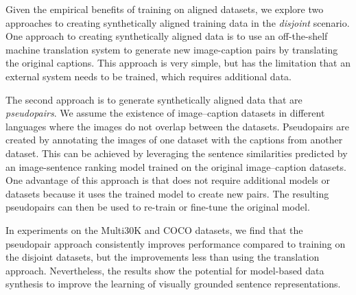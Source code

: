  
 Given the empirical benefits of training on aligned datasets, 
 we explore two approaches to creating synthetically 
 aligned training data in the \emph{disjoint} scenario. 
 One approach to creating synthetically aligned data is to use an
 off-the-shelf machine translation system to generate 
 new image-caption pairs by translating the original
 captions.
 This approach is very simple, but has the limitation 
 that an external system needs to be trained, which requires additional data. 
 
 The second approach is to generate synthetically aligned data that are \emph{pseudopairs}. We assume the existence of image--caption datasets in different languages where the images do not overlap between the datasets. Pseudopairs are created by annotating the images of one dataset with the captions from another dataset. This can be achieved by leveraging the sentence similarities predicted by an image-sentence ranking model trained on the original image--caption datasets. 
 One advantage of this approach is that does not
 require additional models or datasets because it uses the 
 trained model to create new pairs. 
 The resulting pseudopairs can then be used 
 to re-train or fine-tune the original model. 

In experiments on the Multi30K and COCO datasets, we find that the pseudopair approach consistently improves 
performance compared to training on the disjoint datasets, but the improvements less than using the translation approach. Nevertheless, the results show the potential for model-based data synthesis to improve the learning of visually grounded sentence representations. %



